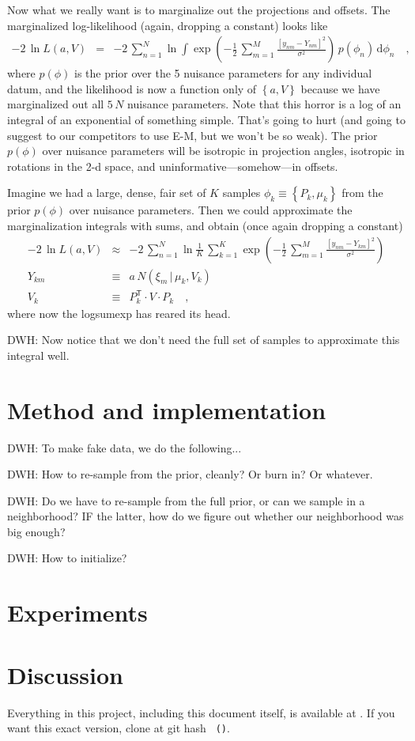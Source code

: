 \documentclass[12pt]{article}
\newcommand{\normal}{N}
\newcommand{\transpose}{^{\mathsf{T}}}
\newcommand{\given}{\,|\,}
\newcommand{\like}{L}
\newcommand{\setof}[1]{\left\{{#1}\right\}}
\newcommand{\dd}{\mathrm{d}}
\begin{document}
Now what we really want is to marginalize out the projections and
offsets.
The marginalized log-likelihood (again, dropping a constant) looks like
\begin{eqnarray}
  -2\,\ln\like(a,V) &=& -2\,\sum_{n=1}^N\ln\int\exp(-\frac{1}{2}\,\sum_{m=1}^M \frac{[y_{nm} - Y_{nm}]^2}{\sigma^2})\,p(\phi_n)\,\dd\phi_n
  \quad,
\end{eqnarray}
where $p(\phi)$ is the prior over the 5 nuisance parameters for any
individual datum, and the likelihood is now a function only of
$\setof{a,V}$ because we have marginalized out all $5\,N$ nuisance
parameters.
Note that this horror is a log of an integral of an exponential of
something simple.
That's going to hurt (and going to suggest to our competitors to use
E-M, but we won't be so weak).
The prior $p(\phi)$ over nuisance parameters will be isotropic in
projection angles, isotropic in rotations in the 2-d space, and
uninformative---somehow---in offsets.

Imagine we had a large, dense, fair set of $K$ samples
$\phi_k\equiv\setof{P_k, \mu_k}$ from the prior $p(\phi)$ over
nuisance parameters.
Then we could approximate the marginalization integrals with sums, and
obtain (once again dropping a constant)
\begin{eqnarray}
  -2\,\ln\like(a,V) &\approx& -2\,\sum_{n=1}^N\ln\frac{1}{K}\,\sum_{k=1}^K\exp(-\frac{1}{2}\,\sum_{m=1}^M \frac{[y_{nm} - Y_{km}]^2}{\sigma^2})
  \\
  Y_{km} &\equiv& a\,\normal(\xi_m\given\mu_k,V_k)
  \\
  V_k &\equiv& P_k\transpose\cdot V\cdot P_k
  \quad,
\end{eqnarray}
where now the logsumexp has reared its head.

DWH: Now notice that we don't need the full set of samples to
approximate this integral well.

\section{Method and implementation}

DWH: To make fake data, we do the following...

DWH: How to re-sample from the prior, cleanly?  Or burn in?  Or whatever.

DWH: Do we have to re-sample from the full prior, or can we sample in
a neighborhood?  IF the latter, how do we figure out whether our
neighborhood was big enough?

DWH: How to initialize?

\section{Experiments}

\section{Discussion}


\bigskip

Everything in this project, including this document itself, is
available at \giturl.  If you want this exact version, clone at git
hash \texttt{\githash~(\gitdate)}.
\end{document}
